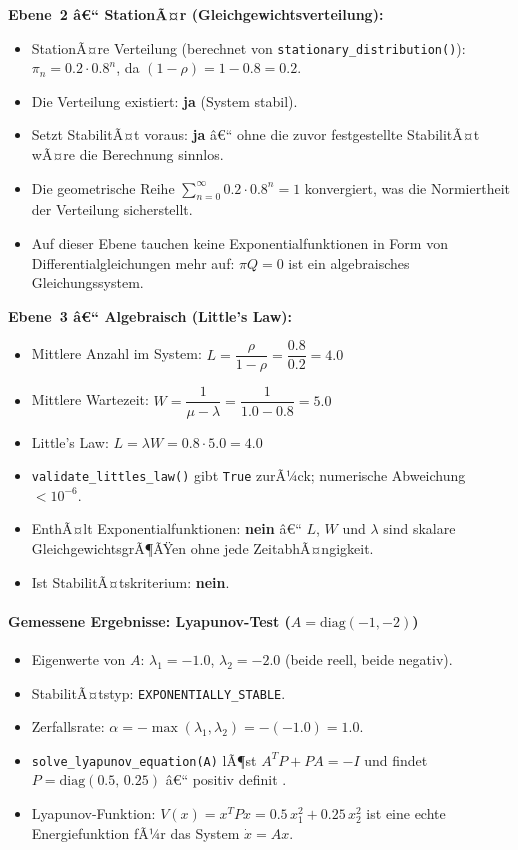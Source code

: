﻿\documentclass[a4paper,12pt]{report}
\theoremstyle{definition}
\begin{document}
\textbf{Ebene~2 â€“ StationÃ¤r (Gleichgewichtsverteilung):}
\begin{itemize}
	\item StationÃ¤re Verteilung (berechnet von
	\texttt{stationary\_distribution()}):
	$\pi_n = 0.2 \cdot 0.8^n$, da $(1-\rho) = 1 - 0.8 = 0.2$.
	\item Die Verteilung existiert: \textbf{ja} (System stabil).
	\item Setzt StabilitÃ¤t voraus: \textbf{ja} â€“ ohne die zuvor
	festgestellte StabilitÃ¤t wÃ¤re die Berechnung sinnlos.
	\item Die geometrische Reihe $\sum_{n=0}^\infty 0.2 \cdot 0.8^n = 1$
	konvergiert, was die Normiertheit der Verteilung sicherstellt.
	\item Auf dieser Ebene tauchen keine Exponentialfunktionen in Form
	von Differentialgleichungen mehr auf: $\pi Q = 0$ ist ein
	algebraisches Gleichungssystem.
\end{itemize}

\textbf{Ebene~3 â€“ Algebraisch (Little's Law):}
\begin{itemize}
	\item Mittlere Anzahl im System:
	$L = \dfrac{\rho}{1-\rho} = \dfrac{0.8}{0.2} = 4.0$
	\item Mittlere Wartezeit:
	$W = \dfrac{1}{\mu - \lambda} = \dfrac{1}{1.0 - 0.8} = 5.0$
	\item Little's Law:
	$L = \lambda W = 0.8 \cdot 5.0 = 4.0$ \checkmark
	\item \texttt{validate\_littles\_law()} gibt \texttt{True} zurÃ¼ck;
	numerische Abweichung $< 10^{-6}$.
	\item EnthÃ¤lt Exponentialfunktionen: \textbf{nein} â€“ $L$, $W$ und
	$\lambda$ sind skalare GleichgewichtsgrÃ¶ÃŸen ohne jede
	ZeitabhÃ¤ngigkeit.
	\item Ist StabilitÃ¤tskriterium: \textbf{nein}.
\end{itemize}

\paragraph{Gemessene Ergebnisse: Lyapunov-Test ($A = \text{diag}(-1,-2)$)}

\begin{itemize}
	\item Eigenwerte von $A$: $\lambda_1 = -1.0$, $\lambda_2 = -2.0$
	(beide reell, beide negativ).
	\item StabilitÃ¤tstyp: \texttt{EXPONENTIALLY\_STABLE}.
	\item Zerfallsrate: $\alpha = -\max(\lambda_1, \lambda_2) =
	-(-1.0) = 1.0$.
	\item \texttt{solve\_lyapunov\_equation(A)} lÃ¶st $A^T P + PA = -I$
	und findet
	$P = \text{diag}(0.5,\, 0.25)$ â€“ positiv definit \checkmark.
	\item Lyapunov-Funktion: $V(x) = x^T P x = 0.5\,x_1^2 + 0.25\,x_2^2$
	ist eine echte Energiefunktion fÃ¼r das System $\dot{x} = Ax$.
\end{itemize}
\end{document}
